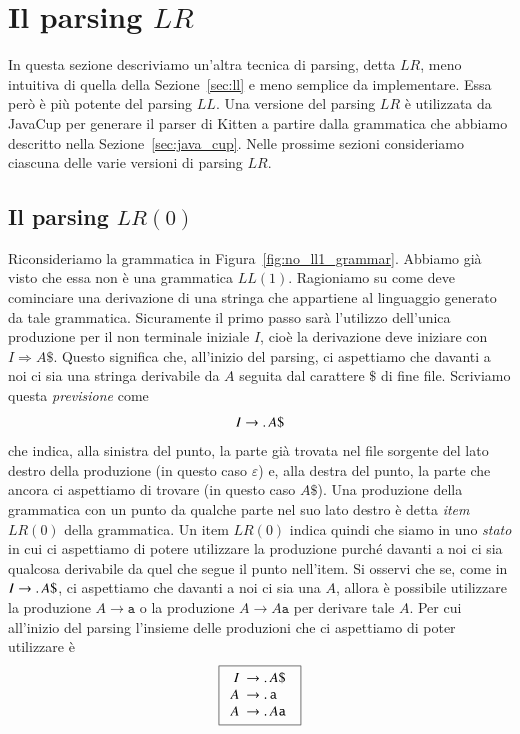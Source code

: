 \section{Il parsing $\mathit{LR}$}\label{sec:lr}
%
In questa sezione descriviamo un'altra tecnica di parsing, detta
$\mathit{LR}$, meno intuitiva
di quella della Sezione~\ref{sec:ll} e meno semplice da implementare.
Essa per\`o \`e pi\`u potente del parsing $\mathit{LL}$. Una versione del
parsing $\mathit{LR}$ \`e utilizzata da JavaCup per generare il parser
di Kitten a partire dalla grammatica che abbiamo descritto nella
Sezione~\ref{sec:java_cup}. Nelle prossime sezioni consideriamo ciascuna
delle varie versioni di parsing $\mathit{LR}$.
%
\subsection{Il parsing $\mathit{LR}(0)$}\label{subsec:lr0}
%
Riconsideriamo la grammatica in Figura~\ref{fig:no_ll1_grammar}. Abbiamo
gi\`a visto che essa non \`e una grammatica $\mathit{LL}(1)$. Ragioniamo su
come deve cominciare una derivazione di una stringa che appartiene al
linguaggio generato da
tale grammatica. Sicuramente il primo passo sar\`a l'utilizzo
dell'unica produzione per il non terminale iniziale $I$, cio\`e
la derivazione deve iniziare con $I\Rightarrow A\mathtt{\$}$.
Questo significa che, all'inizio del parsing, ci aspettiamo che davanti a
noi ci sia una stringa derivabile da $A$ seguita dal carattere
$\mathtt{\$}$ di fine file. Scriviamo questa \emph{previsione} come
\[
  I\to.\, A\mathtt{\$}
\]
che indica, alla sinistra del punto, la parte gi\`a trovata nel file
sorgente del lato destro della produzione (in questo caso $\varepsilon$)
e, alla destra del punto, la parte che ancora
ci aspettiamo di trovare (in questo caso $A\mathtt{\$}$).
Una produzione della grammatica con un punto
da qualche parte nel suo lato destro \`e detta \emph{item $\mathit{LR}(0)$}
della grammatica. Un item $\mathit{LR}(0)$
indica quindi che siamo in uno \emph{stato} in cui
ci aspettiamo di potere
utilizzare la produzione purch\'e davanti a noi ci sia qualcosa derivabile
da quel che segue il punto nell'item. Si osservi che se, come in
$I\to.\, A\mathtt{\$}$, ci aspettiamo che
davanti a noi ci sia una $A$, allora \`e possibile utilizzare la produzione
$A\to\mathtt{a}$ o la produzione $A\to A\mathtt{a}$ per derivare tale $A$.
Per cui all'inizio del parsing l'insieme delle produzioni che ci aspettiamo
di poter utilizzare \`e
\begin{equation}\label{eq:state0}
  \fbox{$
  \begin{array}{rl}
     I \!\!\!& \to\idot A\mathtt{\$}\\
     A \!\!\!& \to\idot\mathtt{a}\\
     A \!\!\!& \to\idot A\mathtt{a}
  \end{array}$
  }
\end{equation}
